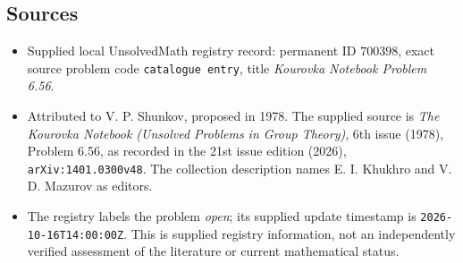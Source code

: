 \documentclass[11pt]{article}
\begin{document}
\subsection{Sources}
\begin{itemize}
\item Supplied local UnsolvedMath registry record: permanent ID \(700398\), exact source problem code \texttt{catalogue entry}, title \emph{Kourovka Notebook Problem 6.56}.
\item Attributed to V. P. Shunkov, proposed in 1978. The supplied source is \emph{The Kourovka Notebook (Unsolved Problems in Group Theory)}, 6th issue (1978), Problem 6.56, as recorded in the 21st issue edition (2026), \texttt{arXiv:1401.0300v48}. The collection description names E. I. Khukhro and V. D. Mazurov as editors.
\item The registry labels the problem \emph{open}; its supplied update timestamp is \texttt{2026-10-16T14:00:00Z}. This is supplied registry information, not an independently verified assessment of the literature or current mathematical status.
\end{itemize}
\end{document}
